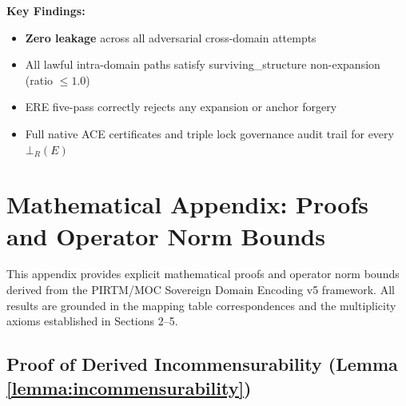 \documentclass[11pt,a4paper]{article}
\begin{document}
\textbf{Key Findings:}
\begin{itemize}
    \item \textbf{Zero leakage} across all adversarial cross-domain attempts
    \item All lawful intra-domain paths satisfy surviving\_structure non-expansion (ratio $\leq 1.0$)
    \item ERE five-pass correctly rejects any expansion or anchor forgery
    \item Full native ACE certificates and triple lock governance audit trail for every $\bot_R(E)$
\end{itemize}

\appendix
\section{Mathematical Appendix: Proofs and Operator Norm Bounds}

This appendix provides explicit mathematical proofs and operator norm bounds derived from the PIRTM/MOC Sovereign Domain Encoding v5 framework. All results are grounded in the mapping table correspondences and the multiplicity axioms established in Sections 2--5.

\subsection{Proof of Derived Incommensurability (Lemma \ref{lemma:incommensurability})}
\end{document}
